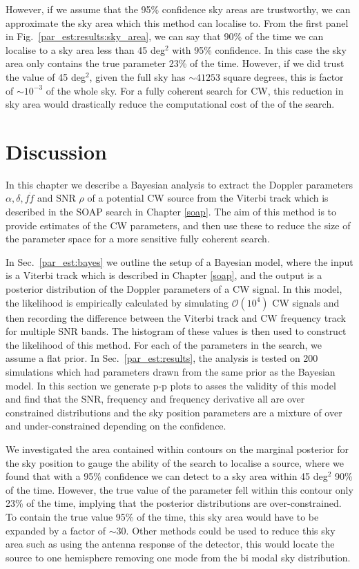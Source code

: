 However, if we assume that the 95\% confidence sky areas are trustworthy, we can approximate the sky area which this method can localise to. 
From the first panel in Fig.~\ref{par_est:results:sky_area}, we can say that 90\% of the time we can localise to a sky area
less than 45 deg$^2$ with 95\% confidence. In this case the sky area only contains the true parameter 23\% of the time. 
However, if we did trust the value of 45 deg$^2$, given the
full sky has $\sim 41253$ square degrees, this is factor of $\sim 10^{-3}$ of
the whole sky.  For a fully coherent search for \gls{CW}, this reduction in sky area would
drastically reduce the computational cost of the of the search.


%
%
\section{Discussion}
%
%

In this chapter we describe a Bayesian
analysis to extract the Doppler parameters $\alpha, \delta, f \dot{f}$ and
\gls{SNR} $\rho$ of a potential \gls{CW} source from the Viterbi track which is
described in the SOAP search in Chapter \ref{soap}. The aim of
this method is to provide estimates of the \gls{CW} parameters, and then use
these to reduce the size of the parameter space for a more sensitive fully coherent search. 

In Sec.~\ref{par_est:bayes} we outline the setup of a Bayesian model,
where the input is a Viterbi track which is described in Chapter \ref{soap}, and the output is a posterior distribution of
the Doppler parameters of a \gls{CW} signal.  In this model, the likelihood is
empirically calculated by simulating $\mathcal{O}(10^4)$ \gls{CW} signals and
then recording the difference between the Viterbi track and \gls{CW} frequency
track for multiple \gls{SNR} bands.  The histogram of these values is
then used to construct the likelihood of this method.  For each of the
parameters in the search, we assume a flat prior.  In
Sec.~\ref{par_est:results}, the analysis is tested on 200 simulations which had
parameters drawn from the same prior as the Bayesian model.  In this section we
generate p-p plots to asses the validity of this model and find that the
\gls{SNR}, frequency and frequency derivative all are over constrained
distributions and the sky position parameters are a mixture of over and under-constrained depending on the confidence. 

We investigated the area contained within contours on the marginal posterior
for the sky position to gauge the ability of the search to localise a source,
where we found that with a 95\% confidence we can detect to a sky area within
45 deg$^2$ 90\% of the time.  
However, the true value of the parameter fell within this contour only 23\% of the
time, implying that the posterior distributions are over-constrained.
To contain the true value 95\% of the time, this sky area would have to be expanded by a factor of $\sim 30$.
Other methods could be used to reduce this sky area such as using the antenna response of the detector, this would locate the source to one hemisphere removing one mode from the bi modal sky distribution.

